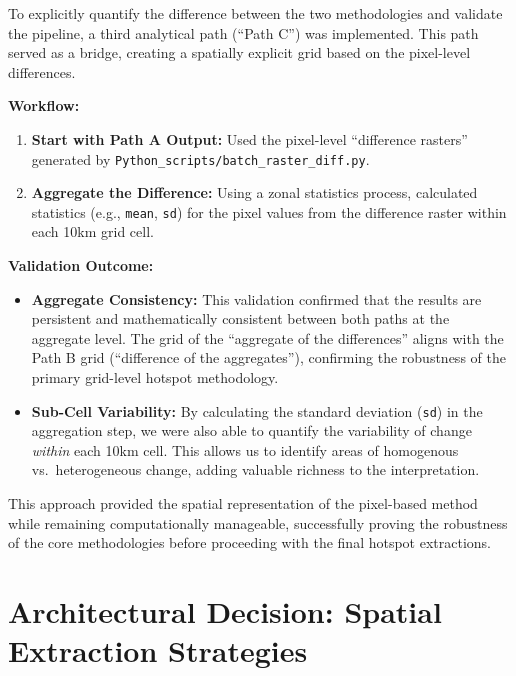 \documentclass[
  letterpaper,
  DIV=11,
  numbers=noendperiod]{scrreprt}
\providecommand{\tightlist}{%
  \setlength{\itemsep}{0pt}\setlength{\parskip}{0pt}}
\begin{document}
To explicitly quantify the difference between the two methodologies and
validate the pipeline, a third analytical path (``Path C'') was
implemented. This path served as a bridge, creating a spatially explicit
grid based on the pixel-level differences.

\textbf{Workflow:}

\begin{enumerate}
\def\labelenumi{\arabic{enumi}.}
\tightlist
\item
  \textbf{Start with Path A Output:} Used the pixel-level ``difference
  rasters'' generated by
  \texttt{Python\_scripts/batch\_raster\_diff.py}.
\item
  \textbf{Aggregate the Difference:} Using a zonal statistics process,
  calculated statistics (e.g., \texttt{mean}, \texttt{sd}) for the pixel
  values from the difference raster within each 10km grid cell.
\end{enumerate}

\textbf{Validation Outcome:}

\begin{itemize}
\tightlist
\item
  \textbf{Aggregate Consistency:} This validation confirmed that the
  results are persistent and mathematically consistent between both
  paths at the aggregate level. The grid of the ``aggregate of the
  differences'' aligns with the Path B grid (``difference of the
  aggregates''), confirming the robustness of the primary grid-level
  hotspot methodology.
\item
  \textbf{Sub-Cell Variability:} By calculating the standard deviation
  (\texttt{sd}) in the aggregation step, we were also able to quantify
  the variability of change \emph{within} each 10km cell. This allows us
  to identify areas of homogenous vs.~heterogeneous change, adding
  valuable richness to the interpretation.
\end{itemize}

This approach provided the spatial representation of the pixel-based
method while remaining computationally manageable, successfully proving
the robustness of the core methodologies before proceeding with the
final hotspot extractions.

\section{Architectural Decision: Spatial Extraction
Strategies}\label{architectural-decision-spatial-extraction-strategies}
\end{document}

